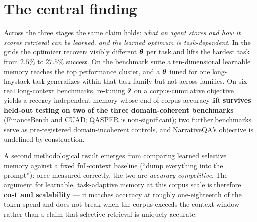 \section{The central finding}
Across the three stages the same claim holds: \emph{what an agent stores and how
it scores retrieval can be learned, and the learned optimum is task-dependent}.
In the grids the optimizer recovers visibly different $\boldsymbol{\theta}$ per task and
lifts the hardest task from $2.5\%$ to $27.5\%$ success. On the benchmark suite a
ten-dimensional learnable memory reaches the top performance cluster, and a
$\boldsymbol{\theta}$ tuned for one long-haystack task generalizes within that task family
but not across families. On six real long-context benchmarks, re-tuning
$\boldsymbol{\theta}$ on a corpus-cumulative objective yields a recency-independent memory
whose end-of-corpus accuracy lift \textbf{survives held-out testing on two of the
three domain-coherent benchmarks} (FinanceBench and CUAD; QASPER is
non-significant); two further benchmarks serve as pre-registered
domain-incoherent controls, and NarrativeQA's objective is undefined by
construction.

A second methodological result emerges from comparing learned selective memory
against a fixed full-context baseline (``dump everything into the prompt''): once
measured correctly, the two are \emph{accuracy-competitive}. The argument for
learnable, task-adaptive memory at this corpus scale is therefore \textbf{cost
and scalability} --- it matches accuracy at roughly one-eighteenth of the token
spend and does not break when the corpus exceeds the context window --- rather
than a claim that selective retrieval is uniquely accurate.

